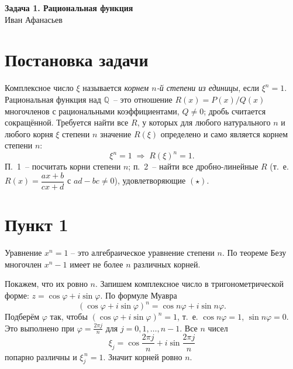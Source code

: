 \documentclass[12pt,a4paper]{article}
\begin{document}
\sloppy

\begin{center}
  {\LARGE\bfseries Задача 1. Рациональная функция}\\[4pt]
  {\large Иван Афанасьев}\\[2pt]
\end{center}

\vspace{6pt}
\begin{center}
\end{center}
\vspace{10pt}

\section{Постановка задачи}

Комплексное число $\xi$ называется \emph{корнем $n$-й степени из единицы},
если $\xi^{n}=1$. Рациональная функция над $\mathbb Q$~-- это отношение
$R(x)=P(x)/Q(x)$ многочленов с рациональными коэффициентами, $Q\ne0$;
дробь считается сокращённой. Требуется найти все $R$, у которых для любого
натурального $n$ и любого корня $\xi$ степени $n$ значение $R(\xi)$
определено и само является корнем степени $n$:
\[
  \xi^{n}=1 \;\Rightarrow\; R(\xi)^{n}=1. \tag{$\star$}
\]
П.~1~-- посчитать корни степени $n$; п.~2~-- найти все дробно-линейные
$R$ (т.~е. $R(x)=\dfrac{ax+b}{cx+d}$ с $ad-bc\ne0$), удовлетворяющие
$(\star)$.

\section{Пункт 1}

Уравнение $x^{n}=1$ -- это алгебраическое уравнение степени $n$. По
теореме Безу многочлен $x^{n}-1$ имеет не более $n$ различных корней.

Покажем, что их ровно $n$. Запишем комплексное число в тригонометрической
форме: $z = \cos\varphi + i\sin\varphi$. По формуле Муавра
\[
  (\cos\varphi + i\sin\varphi)^{n} = \cos n\varphi + i\sin n\varphi .
\]
Подберём $\varphi$ так, чтобы $(\cos\varphi + i\sin\varphi)^{n}=1$, т.~е.
$\cos n\varphi = 1$, $\sin n\varphi = 0$. Это выполнено при
$\varphi = \frac{2\pi j}{n}$ для $j=0,1,\dots,n-1$. Все $n$ чисел
\[
  \xi_j = \cos\frac{2\pi j}{n} + i\sin\frac{2\pi j}{n}
\]
попарно различны и $\xi_j^{\,n}=1$. Значит корней ровно $n$.
\end{document}

